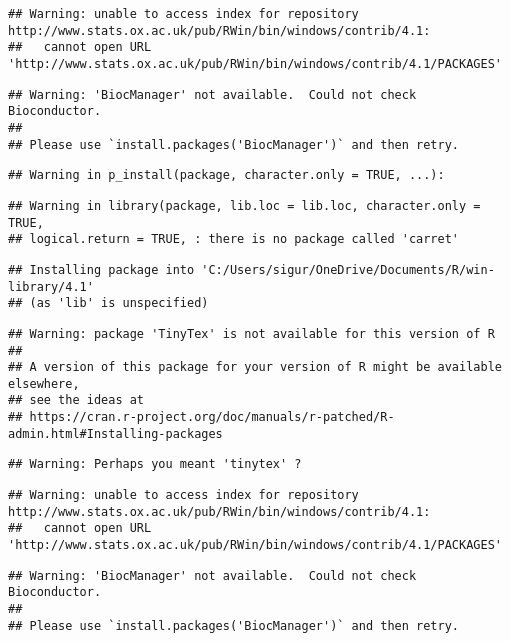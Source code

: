 \documentclass[
]{article}
\begin{document}
\begin{verbatim}
## Warning: unable to access index for repository http://www.stats.ox.ac.uk/pub/RWin/bin/windows/contrib/4.1:
##   cannot open URL 'http://www.stats.ox.ac.uk/pub/RWin/bin/windows/contrib/4.1/PACKAGES'
\end{verbatim}

\begin{verbatim}
## Warning: 'BiocManager' not available.  Could not check Bioconductor.
## 
## Please use `install.packages('BiocManager')` and then retry.
\end{verbatim}

\begin{verbatim}
## Warning in p_install(package, character.only = TRUE, ...):
\end{verbatim}

\begin{verbatim}
## Warning in library(package, lib.loc = lib.loc, character.only = TRUE,
## logical.return = TRUE, : there is no package called 'carret'
\end{verbatim}

\begin{verbatim}
## Installing package into 'C:/Users/sigur/OneDrive/Documents/R/win-library/4.1'
## (as 'lib' is unspecified)
\end{verbatim}

\begin{verbatim}
## Warning: package 'TinyTex' is not available for this version of R
## 
## A version of this package for your version of R might be available elsewhere,
## see the ideas at
## https://cran.r-project.org/doc/manuals/r-patched/R-admin.html#Installing-packages
\end{verbatim}

\begin{verbatim}
## Warning: Perhaps you meant 'tinytex' ?
\end{verbatim}

\begin{verbatim}
## Warning: unable to access index for repository http://www.stats.ox.ac.uk/pub/RWin/bin/windows/contrib/4.1:
##   cannot open URL 'http://www.stats.ox.ac.uk/pub/RWin/bin/windows/contrib/4.1/PACKAGES'
\end{verbatim}

\begin{verbatim}
## Warning: 'BiocManager' not available.  Could not check Bioconductor.
## 
## Please use `install.packages('BiocManager')` and then retry.
\end{verbatim}
\end{document}
